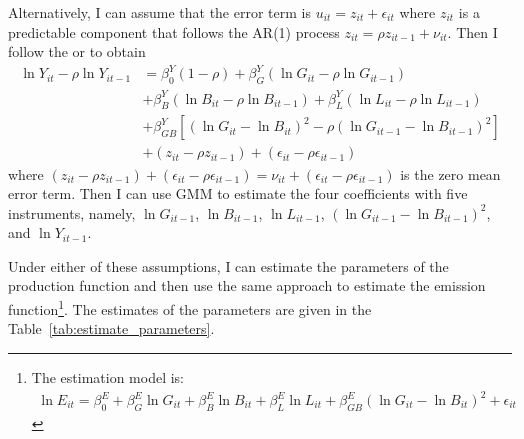 Alternatively, I can assume that the error term is $u_{it} = z_{it} + \epsilon_{it}$ where $z_{it}$ is a predictable component that follows the AR(1) process $z_{it} = \rho z_{it-1} + \nu_{it}$. Then I follow the \cite{blundell2000gmm} or \cite{davis2014macroeconomic} to obtain
\begin{equation*}
  \begin{split}
    \ln Y_{it} - \rho \ln Y_{it-1} & = \beta_0^Y(1-\rho) + \beta_G^Y (\ln G_{it} - \rho \ln G_{it-1}) \\
    &  + \beta_B^Y (\ln B_{it} - \rho \ln B_{it-1}) + \beta_L^Y (\ln L_{it} - \rho \ln L_{it-1}) \\
    & + \beta_{GB}^Y [(\ln G_{it} -  \ln B_{it} )^2 - \rho(\ln G_{it-1} - \ln B_{it-1})^2]\\
    & + (z_{it} - \rho z_{it-1}) + (\epsilon_{it} - \rho \epsilon_{it-1})
  \end{split}
\end{equation*}
where $(z_{it} - \rho z_{it-1}) + (\epsilon_{it} - \rho \epsilon_{it-1}) = \nu_{it} + (\epsilon_{it} - \rho \epsilon_{it-1})$ is the zero mean error term. Then I can use GMM to estimate the four coefficients with five instruments, namely, $\ln G_{it-1}$, $\ln B_{it-1}$, $\ln L_{it-1}$, $(\ln G_{it-1} - \ln B_{it-1})^2$, and $\ln Y_{it-1}$.

Under either of these assumptions, I can estimate the parameters of the production function and then use the same approach to estimate the emission function\footnote{ The estimation model is:
\begin{gather*}
    \ln E_{it} = \beta_0^E + \beta_G^E \ln G_{it} + \beta_B^E \ln B_{it} + \beta_L^E \ln L_{it} + \beta_{GB}^E (\ln G_{it} - \ln B_{it})^2 + \epsilon_{it}
\end{gather*}}. The estimates of the parameters are given in the Table~\ref{tab:estimate_parameters}.

